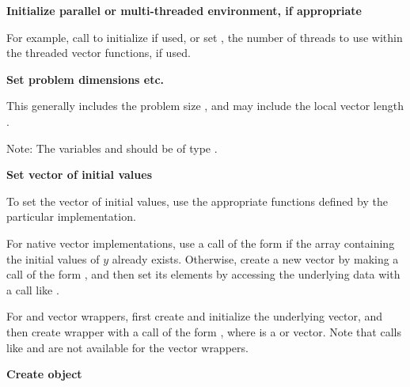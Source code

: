 \begin{Steps}
  
\item 
  {\bf Initialize parallel or multi-threaded environment, if appropriate}

  For example, call  to initialize {\mpi} if used, or
  set , the number of threads to use within the threaded
  vector functions, if used.
 
\item
  {\bf Set problem dimensions etc.}

  This generally includes the problem size , and may include
  the local vector length .

  Note: The variables  and  should be of type .

\item
  {\bf Set vector of initial values}
 
  To set the vector  of initial values, use the appropriate
  functions defined by the particular {\nvector} implementation. 
  
  For native {\sundials} vector implementations, use a call 
  of the form  if the  array 
   containing the initial values of $y$ already exists.
  Otherwise, create a new vector by making a call of the form
  , and then set its elements by accessing 
  the underlying data with a call like 
  .
  
  For {\hypre} and {\petsc} vector wrappers, first create and initialize 
  the underlying vector, and then create {\nvector} wrapper with a call 
  of the form , where  is a {\hypre}
  or {\petsc} vector. Note that calls like  and 
   are not available for the vector wrappers.
  

\item\label{i:cvode_create} 
  {\bf Create {\cvode} object}


\end{Steps}

